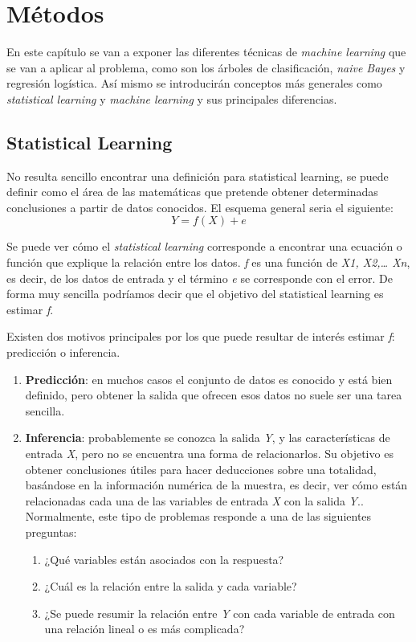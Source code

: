 \chapter {Métodos}

En este capítulo se van a exponer las diferentes técnicas de \textit{machine learning} que se van a aplicar al problema, como son los árboles de clasificación, \textit{naive Bayes} y regresión logística. Así mismo se introducirán conceptos más generales como \textit{statistical learning} y \textit{machine learning} y sus principales diferencias.\par 

\section{Statistical Learning}

No resulta sencillo encontrar una definición para statistical learning, se puede definir como el área de las matemáticas que pretende obtener determinadas conclusiones a partir de datos conocidos\cite{ISL}. El esquema general seria el siguiente:
\begin{equation}\label{eq:estimation}
	Y = f(X) + e 
\end{equation}

Se puede ver cómo el \textit{statistical learning} corresponde a encontrar una ecuación o función que explique la relación entre los datos. \textit{f} es una función de \textit{X1, X2,… Xn}, es decir, de los datos de entrada y el término \textit{e} se corresponde con el error. De forma muy sencilla podríamos decir que el objetivo del statistical learning es estimar \textit{f}. \par 

Existen dos motivos principales por los que puede resultar de interés estimar \textit{f}: predicción o inferencia.\cite{ISL}
\begin{enumerate}
\item \textbf{Predicción}: en muchos casos el conjunto de datos es conocido y está bien definido, pero obtener la salida que ofrecen esos datos no suele ser una tarea sencilla.
\item \textbf{Inferencia}: probablemente se conozca la salida \textit{Y}, y las características de entrada \textit{X}, pero no se encuentra una forma de relacionarlos. Su objetivo es obtener conclusiones útiles para hacer deducciones sobre una totalidad, basándose en la información numérica de la muestra, es decir, ver cómo están relacionadas cada una de las variables de entrada \textit{X} con la salida \textit{Y}.\cite{inferencia_wiki}. Normalmente, este tipo de problemas responde a una de las siguientes preguntas:
\begin{enumerate}
\item ¿Qué variables están asociados con la respuesta?
\item ¿Cuál es la relación entre la salida y cada variable?
\item ¿Se puede resumir la relación entre \textit{Y} con cada variable de entrada con una relación lineal o es más complicada?
\end{enumerate}
\end{enumerate}

